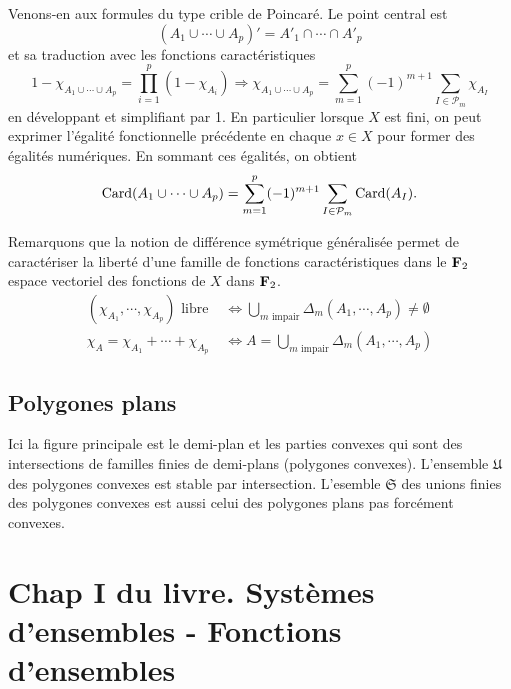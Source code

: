 \noindent Venons-en aux formules du type crible de Poincaré. Le point central est 
\begin{displaymath}
  (A_1 \cup \cdots \cup A_p)' = A'_1 \cap \cdots \cap A'_p
\end{displaymath}
et sa traduction avec les fonctions caractéristiques
\begin{displaymath}
  1 - \chi_{A_1 \cup \cdots \cup A_p} = \prod_{i=1}^p(1 - \chi_{A_i})
  \Rightarrow
  \chi_{A_1 \cup \cdots \cup A_p} = \sum_{m=1}^p (-1)^{m+1}\sum_{I \in \mathcal{P}_m}\chi_{A_I} 
\end{displaymath}
en développant et simplifiant par 1.\newline
En particulier lorsque $X$ est fini, on peut exprimer l'égalité fonctionnelle précédente en chaque $x\in X$ pour former des égalités numériques. En sommant ces égalités, on obtient
\begin{displaymath}
  \mathop{\mathrm{Card}}(A_1 \cup \cdots \cup A_p) = \sum_{m=1}^p (-1)^{m+1}\sum_{I \in \mathcal{P}_m}\mathop{\mathrm{Card}}(A_I).
\end{displaymath}


\noindent Remarquons que la notion de différence symétrique généralisée permet de caractériser la liberté d'une famille de fonctions caractéristiques dans le $\mathbf{F}_2$ espace vectoriel des fonctions de $X$ dans $\mathbf{F}_2$.
\begin{align*}
  (\chi_{A_1}, \cdots, \chi_{A_p}) \text{ libre } &\Leftrightarrow \bigcup_{m \text{ impair}} \Delta_m(A_1, \cdots, A_p) \not = \emptyset \\
  \chi_A = \chi_{A_1} + \cdots + \chi_{A_p} &\Leftrightarrow A = \bigcup_{m \text{ impair}} \Delta_m(A_1, \cdots, A_p)
\end{align*}

\subsection{Polygones plans}\label{ExplePolyg}
Ici la figure principale est le demi-plan et les parties convexes qui sont des intersections de familles finies de demi-plans (polygones convexes). L'ensemble $\mathfrak U$ des polygones convexes est stable par intersection. L'esemble $\mathfrak{S}$ des unions finies des polygones convexes est aussi celui des polygones plans pas forcément convexes.

\section{Chap I du livre. Systèmes d'ensembles - Fonctions d'ensembles}\label{SystFoncEns}
